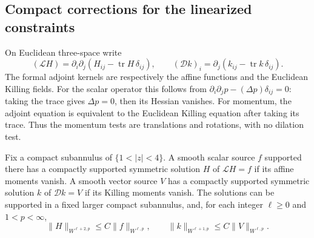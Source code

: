 \subsection{Compact corrections for the linearized constraints}

On Euclidean three-space write
\[
 (\mathcal LH)=\partial_i\partial_j
                (H_{ij}-\operatorname{tr}H\,\delta_{ij}),
 \qquad
 (\mathcal Dk)_i=\partial_j
                (k_{ij}-\operatorname{tr}k\,\delta_{ij}).
\]
The formal adjoint kernels are respectively the affine functions
and the Euclidean Killing fields. For the scalar operator this follows
from $\partial_i\partial_jp-(\Delta p)\delta_{ij}=0$: taking the
trace gives $\Delta p=0$, then its Hessian vanishes. For momentum,
the adjoint equation is equivalent to the Euclidean Killing equation
after taking its trace. Thus the momentum tests are translations
and rotations, with no dilation test.

\begin{lemma}\label{en:compact-inverses}
Fix a compact subannulus of $\{1<|z|<4\}$. A smooth scalar source
$f$ supported there has a compactly supported symmetric solution
$H$ of $\mathcal LH=f$ if its affine moments vanish. A smooth
vector source $V$ has a compactly supported symmetric solution
$k$ of $\mathcal Dk=V$ if its Killing moments vanish. The solutions
can be supported in a fixed larger compact subannulus, and, for
each integer $\ell\geq0$ and $1<p<\infty$,
\begin{equation}\label{en:inverse-estimates}
 \|H\|_{W^{\ell+2,p}}\leq C\|f\|_{W^{\ell,p}},
 \qquad
 \|k\|_{W^{\ell+1,p}}\leq C\|V\|_{W^{\ell,p}}.
\end{equation}
\end{lemma}

